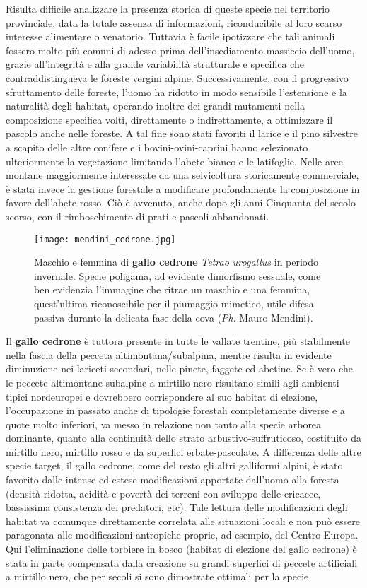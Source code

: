 \documentclass[10pt,twoside,openany,x11names,svgnames,italian,a5paper,dvipsnames,table]{memoir}
\newcommand{\ph}{\emph{Ph}. }
\begin{document}
Risulta difficile analizzare la presenza storica di queste specie nel territorio provinciale, data la totale assenza di informazioni, riconducibile al loro scarso interesse alimentare o venatorio. Tuttavia è facile ipotizzare che tali animali fossero molto più comuni di adesso prima dell’insediamento massiccio dell’uomo, grazie all’integrità e alla grande variabilità strutturale e specifica che contraddistingueva le foreste vergini alpine. Successivamente, con il progressivo sfruttamento delle foreste, l’uomo ha ridotto in modo sensibile l’estensione e la naturalità degli habitat, operando inoltre dei grandi mutamenti nella composizione specifica volti, direttamente o indirettamente, a ottimizzare il pascolo  anche nelle foreste. A tal fine sono stati favoriti  il larice e il pino silvestre a scapito delle altre conifere e i bovini-ovini-caprini hanno selezionato ulteriormente la vegetazione limitando l'abete bianco e le latifoglie. Nelle aree montane maggiormente interessate da una selvicoltura storicamente commerciale, è stata invece la gestione forestale a modificare profondamente la composizione in favore dell’abete rosso. Ciò è avvenuto, anche dopo gli anni Cinquanta del secolo scorso, con il rimboschimento di prati e pascoli abbandonati. 
\begin{wrapfigure}{l}{.6\columnwidth}
\centering
  \texttt{[image: mendini\_cedrone.jpg]}
  \caption*{Maschio e femmina di \textbf{gallo cedrone} \emph{Tetrao urogallus} in periodo invernale. Specie poligama, ad evidente dimorfismo sessuale, come ben evidenzia l’immagine  che ritrae un maschio e una femmina, quest’ultima riconoscibile per il piumaggio mimetico, utile difesa passiva durante la delicata fase della cova (\ph Mauro Mendini).}
\end{wrapfigure}
Il \textbf{gallo cedrone} è tuttora presente in tutte le vallate trentine, più stabilmente nella fascia della pecceta altimontana/subalpina, mentre risulta in evidente diminuzione nei lariceti secondari, nelle pinete, faggete ed abetine. Se è vero che le peccete altimontane-subalpine a mirtillo nero risultano simili agli ambienti tipici nordeuropei e dovrebbero corrispondere al suo habitat di elezione, l’occupazione in passato anche di tipologie forestali completamente diverse e a quote molto inferiori, va messo in relazione non tanto alla specie arborea dominante, quanto alla continuità dello strato arbustivo-suffruticoso, costituito da mirtillo nero, mirtillo rosso e da superfici erbate-pascolate. A differenza delle altre specie target, il gallo cedrone, come del resto gli altri galliformi alpini, è stato favorito dalle intense ed estese modificazioni apportate dall’uomo \cite{Angeli07} alla foresta (densità ridotta, acidità e povertà dei terreni con sviluppo delle ericacee, bassissima consistenza dei predatori, etc). Tale lettura delle modificazioni degli habitat va comunque direttamente correlata alle situazioni locali e non può essere paragonata alle modificazioni antropiche proprie, ad esempio, del Centro Europa. Qui l’eliminazione delle torbiere in bosco (habitat di elezione del gallo cedrone) è stata in parte compensata dalla creazione su grandi superfici di peccete artificiali a mirtillo nero, che per secoli si sono dimostrate ottimali per la specie.
\end{document}
